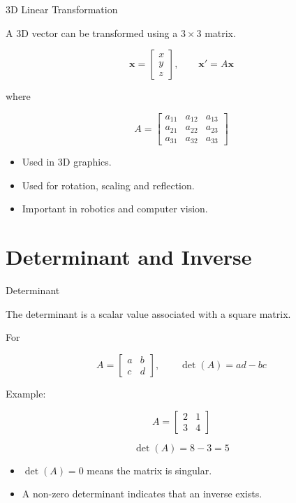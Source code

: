 \documentclass[aspectratio=169]{beamer}
\begin{document}
\begin{frame}{3D Linear Transformation}
\small

A 3D vector can be transformed using a $3\times3$ matrix.

$$
\mathbf{x}=
\begin{bmatrix}
x\\
y\\
z
\end{bmatrix},
\qquad
\mathbf{x}'=A\mathbf{x}
$$

where

$$
A=
\begin{bmatrix}
a_{11}&a_{12}&a_{13}\\
a_{21}&a_{22}&a_{23}\\
a_{31}&a_{32}&a_{33}
\end{bmatrix}
$$

\begin{itemize}
\item Used in 3D graphics.
\item Used for rotation, scaling and reflection.
\item Important in robotics and computer vision.
\end{itemize}

\end{frame}

\section{Determinant and Inverse}

\begin{frame}{Determinant}
\small

The determinant is a scalar value associated with a square matrix.

For

$$
A=
\begin{bmatrix}
a&b\\
c&d
\end{bmatrix},
\qquad
\det(A)=ad-bc
$$

Example:

$$
A=
\begin{bmatrix}
2&1\\
3&4
\end{bmatrix}
$$

$$
\det(A)=8-3=5
$$

\begin{itemize}
\item $\det(A)=0$ means the matrix is singular.
\item A non-zero determinant indicates that an inverse exists.
\end{itemize}

\end{frame}
\end{document}
